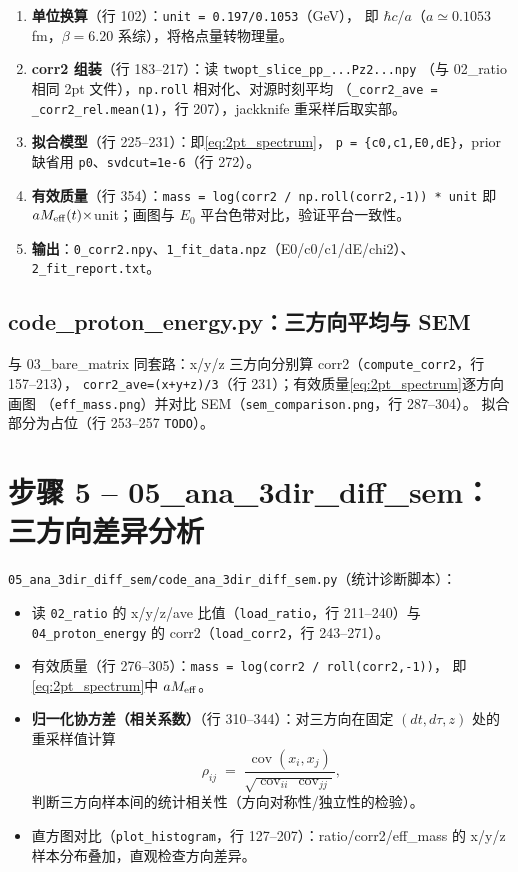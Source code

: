 \documentclass[UTF8,11pt]{ctexart}
\begin{document}
\begin{enumerate}
  \item \textbf{单位换算}（行 102）：\texttt{unit = 0.197/0.1053}（GeV），
  即 $\hbar c / a$（$a\simeq0.1053$ fm，$\beta=6.20$ 系综），将格点量转物理量。
  \item \textbf{corr2 组装}（行 183--217）：读 \texttt{twopt\_slice\_pp\_...Pz2...npy}
  （与 02\_ratio 相同 2pt 文件），\texttt{np.roll} 相对化、对源时刻平均
  （\texttt{\_corr2\_ave = \_corr2\_rel.mean(1)}，行 207），jackknife 重采样后取实部。
  \item \textbf{拟合模型}（行 225--231）：即\eqref{eq:2pt_spectrum}，
  \texttt{p = \{c0,c1,E0,dE\}}，prior 缺省用 \texttt{p0}、\texttt{svdcut=1e-6}（行 272）。
  \item \textbf{有效质量}（行 354）：\texttt{mass = log(corr2 / np.roll(corr2,-1)) * unit}
  即 $aM_{\rm eff}(t)\times$unit；画图与 $E_0$ 平台色带对比，验证平台一致性。
  \item \textbf{输出}：\texttt{0\_corr2.npy}、\texttt{1\_fit\_data.npz}（E0/c0/c1/dE/chi2）、
  \texttt{2\_fit\_report.txt}。
\end{enumerate}

\subsection{code\_proton\_energy.py：三方向平均与 SEM}
\label{sec:energy3dir}

与 03\_bare\_matrix 同套路：x/y/z 三方向分别算 corr2（\texttt{compute\_corr2}，行 157--213），
\texttt{corr2\_ave=(x+y+z)/3}（行 231）；有效质量\eqref{eq:2pt_spectrum}逐方向画图
（\texttt{eff\_mass.png}）并对比 SEM（\texttt{sem\_comparison.png}，行 287--304）。
拟合部分为占位（行 253--257 \texttt{TODO}）。

\section{步骤 5 -- 05\_ana\_3dir\_diff\_sem：三方向差异分析}
\label{sec:step5}

\texttt{05\_ana\_3dir\_diff\_sem/code\_ana\_3dir\_diff\_sem.py}（统计诊断脚本）：
\begin{itemize}
  \item 读 \texttt{02\_ratio} 的 x/y/z/ave 比值（\texttt{load\_ratio}，行 211--240）与
  \texttt{04\_proton\_energy} 的 corr2（\texttt{load\_corr2}，行 243--271）。
  \item 有效质量（行 276--305）：\texttt{mass = log(corr2 / roll(corr2,-1))}，
  即\eqref{eq:2pt_spectrum}中 $aM_{\rm eff}$。
  \item \textbf{归一化协方差（相关系数）}（行 310--344）：对三方向在固定 $(dt,d\tau,z)$
  处的重采样值计算
  \begin{equation*}
    \rho_{ij} \;=\; \frac{\operatorname{cov}(x_i,x_j)}{\sqrt{\operatorname{cov}_{ii}\,\operatorname{cov}_{jj}}},
  \end{equation*}
  判断三方向样本间的统计相关性（方向对称性/独立性的检验）。
  \item 直方图对比（\texttt{plot\_histogram}，行 127--207）：ratio/corr2/eff\_mass
  的 x/y/z 样本分布叠加，直观检查方向差异。
\end{itemize}
\end{document}
